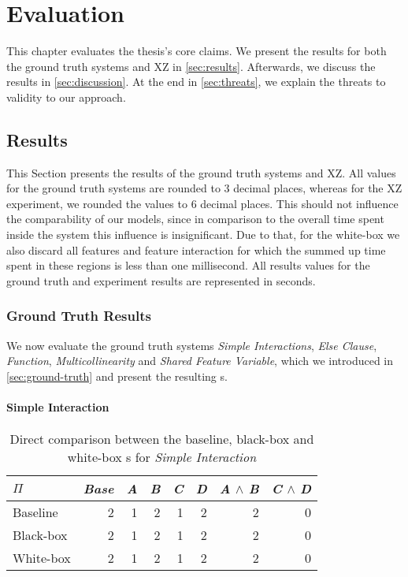 \chapter{Evaluation}\label{ch:evaluation}
\lstset{style=myStyle}

This chapter evaluates the thesis's core claims.  
We present the results for both the ground truth systems and \textsc{XZ} in \autoref{sec:results}.
Afterwards, we discuss the results in \autoref{sec:discussion}. At the end in \autoref{sec:threats}, we explain the threats to validity to our approach.

\section{Results}\label{sec:results}

This Section presents the results of the ground truth systems and \textsc{XZ}.
All values for the ground truth systems are rounded to 3 decimal places, whereas for the \textsc{XZ} experiment,
we rounded the values to 6 decimal places.
This should not influence the comparability of our models, since in comparison
to the overall time spent inside the system this influence is insignificant. Due to that, for the white-box we also discard all features
and feature interaction for which the summed up time spent in these regions is less than one millisecond.
All results values for the ground truth and experiment results are represented in seconds.

\subsection{Ground Truth Results}
We now evaluate the ground truth systems \emph{Simple Interactions}, \emph{Else Clause}, \emph{Function}, \emph{Multicollinearity} 
and \emph{Shared Feature Variable}, which we introduced in \autoref{sec:ground-truth} and present the resulting {\perfInfluenceModel}s.

\subsubsection*{Simple Interaction}

\begin{table}[H]
    \centering
    \begin{tabular}{lrrrrrrr}
    \toprule
    $\Pi$    & \emph{Base} & \emph{A} & \emph{B} & \emph{C} & \emph{D} & \emph{A} $\land$ \emph{B} & \emph{C} $\land$ \emph{D}  \\ \midrule
    Baseline & 2    & 1 & 2 & 1 & 2 & 2           & 0            \\
    Black-box & 2    & 1 & 2 & 1 & 2 & 2           & 0           \\
    White-box & 2    & 1 & 2 & 1 & 2 & 2           & 0           \\ \bottomrule
    \end{tabular}  
    \caption{Direct comparison between the baseline, black-box and white-box {\perfInfluenceModel}s for \emph{Simple Interaction}}\label{aggr:results-simple-interaction}
\end{table}

